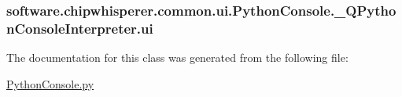 \subsubsection[{ui}]{\setlength{\rightskip}{0pt plus 5cm}software.\+chipwhisperer.\+common.\+ui.\+Python\+Console.\+\_\+\+Q\+Python\+Console\+Interpreter.\+ui}\label{classsoftware_1_1chipwhisperer_1_1common_1_1ui_1_1PythonConsole_1_1__QPythonConsoleInterpreter_a5167337e752acb38c800ae701d58a2e7}


The documentation for this class was generated from the following file\+:\begin{DoxyCompactItemize}
\item 
\hyperlink{PythonConsole_8py}{Python\+Console.\+py}\end{DoxyCompactItemize}
